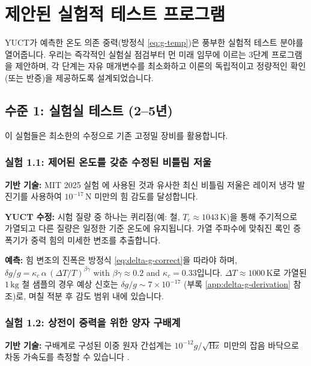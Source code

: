 \documentclass[11pt,a4paper]{article}
\begin{document}
	\section{제안된 실험적 테스트 프로그램}
	\label{sec:experiments}
	
	YUCT가 예측한 온도 의존 중력(방정식 \ref{eq:g-temp})은 풍부한 실험적 테스트 분야를 열어줍니다.  
	우리는 즉각적인 실험실 점검부터 먼 미래 임무에 이르는 3단계 프로그램을 제안하며, 각 단계는 자유 매개변수를 최소화하고 이론의 독립적이고 정량적인 확인(또는 반증)을 제공하도록 설계되었습니다.
	
	\subsection{수준 1: 실험실 테스트 (2–5년)}
	\label{subsec:lab-tests}
	
	이 실험들은 최소한의 수정으로 기존 고정밀 장비를 활용합니다.
	
	\subsubsection{실험 1.1: 제어된 온도를 갖춘 수정된 비틀림 저울}
	
	\textbf{기반 기술:} MIT 2025 실험 \cite{MIT2025}에 사용된 것과 유사한 최신 비틀림 저울은 레이저 냉각 발진기를 사용하여 $10^{-17}\,\mathrm{N}$ 미만의 힘 감도를 달성합니다.
	
	\textbf{YUCT 수정:} 시험 질량 중 하나는 퀴리점(예: 철, $T_c\approx1043\,\mathrm{K}$)을 통해 주기적으로 가열되고 다른 질량은 일정한 기준 온도에 유지됩니다. 가열 주파수에 맞춰진 록인 증폭기가 중력 힘의 미세한 변조를 추출합니다.
	
	\textbf{예측:} 힘 변조의 진폭은 방정식 \ref{eq:delta-g-correct}을 따라야 하며, $\delta g/g = \kappa_c\,\alpha\,(\Delta T/T)^{\beta\gamma}$ with $\beta\gamma\approx0.2$ and $\kappa_c=0.33$입니다. $\Delta T\approx1000\,\mathrm{K}$로 가열된 $1\,\mathrm{kg}$ 철 샘플의 경우 예상 신호는 $\delta g/g \sim 7\times10^{-17}$ (부록 \ref{app:delta-g-derivation} 참조)로, 며칠 적분 후 감도 범위 내에 있습니다.
	
	\subsubsection{실험 1.2: 상전이 중력을 위한 양자 구배계}
	
	\textbf{기반 기술:} 구배계로 구성된 이중 원자 간섭계는 $10^{-12}g/\sqrt{\mathrm{Hz}}$ 미만의 잡음 바닥으로 차동 가속도를 측정할 수 있습니다 \cite{Snadden1998}.
	
\end{document}

